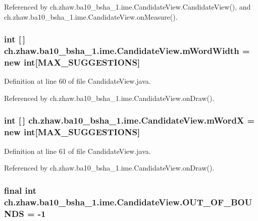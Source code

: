 Referenced by ch.zhaw.ba10\_\-bsha\_\-1.ime.CandidateView.CandidateView(), and ch.zhaw.ba10\_\-bsha\_\-1.ime.CandidateView.onMeasure().\hypertarget{classch_1_1zhaw_1_1ba10__bsha__1_1_1ime_1_1CandidateView_a88507b3d2c0823b5b3ab79799af801a3}{
\subsubsection[{mWordWidth}]{\setlength{\rightskip}{0pt plus 5cm}int \mbox{[}$\,$\mbox{]} {\bf ch.zhaw.ba10\_\-bsha\_\-1.ime.CandidateView.mWordWidth} = new int\mbox{[}{\bf MAX\_\-SUGGESTIONS}\mbox{]}}}
\label{classch_1_1zhaw_1_1ba10__bsha__1_1_1ime_1_1CandidateView_a88507b3d2c0823b5b3ab79799af801a3}


Definition at line 60 of file CandidateView.java.

Referenced by ch.zhaw.ba10\_\-bsha\_\-1.ime.CandidateView.onDraw().\hypertarget{classch_1_1zhaw_1_1ba10__bsha__1_1_1ime_1_1CandidateView_ac4308faba65c9f711d459d494630f8e9}{
\subsubsection[{mWordX}]{\setlength{\rightskip}{0pt plus 5cm}int \mbox{[}$\,$\mbox{]} {\bf ch.zhaw.ba10\_\-bsha\_\-1.ime.CandidateView.mWordX} = new int\mbox{[}{\bf MAX\_\-SUGGESTIONS}\mbox{]}}}
\label{classch_1_1zhaw_1_1ba10__bsha__1_1_1ime_1_1CandidateView_ac4308faba65c9f711d459d494630f8e9}


Definition at line 61 of file CandidateView.java.

Referenced by ch.zhaw.ba10\_\-bsha\_\-1.ime.CandidateView.onDraw().\hypertarget{classch_1_1zhaw_1_1ba10__bsha__1_1_1ime_1_1CandidateView_a9315efa15e2f117b2253fc55d3d1912d}{
\subsubsection[{OUT\_\-OF\_\-BOUNDS}]{\setlength{\rightskip}{0pt plus 5cm}final int {\bf ch.zhaw.ba10\_\-bsha\_\-1.ime.CandidateView.OUT\_\-OF\_\-BOUNDS} = -\/1}}
\label{classch_1_1zhaw_1_1ba10__bsha__1_1_1ime_1_1CandidateView_a9315efa15e2f117b2253fc55d3d1912d}


